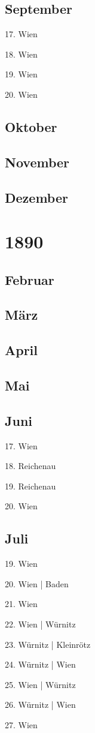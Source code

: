 \documentclass[twoside=false,titlepage=false,open=any, parskip=never, fontsize=10pt, headings=small, chapterprefix=false, appendixprefix=false, DIV=15]{scrbook}
\begin{document}
\begin{multicols}{3}
            \section*{September}
            17. Wien\par
            18. Wien\par
            19. Wien\par
            20. Wien\par
            \section*{Oktober}
            \section*{November}
            \section*{Dezember}
            \chapter*{1890}
            \section*{Februar}
            \section*{März}
            \section*{April}
            \section*{Mai}
            \section*{Juni}
            17. Wien\par
            18. Reichenau\par
            19. Reichenau\par
            20. Wien\par
            \section*{Juli}
            19. Wien\par
            20. Wien | Baden\par
            21. Wien\par
            22. Wien | Würnitz\par
            23. Würnitz | Kleinrötz\par
            24. Würnitz | Wien\par
            25. Wien | Würnitz\par
            26. Würnitz | Wien\par
            27. Wien\par

\end{multicols}
\end{document}
